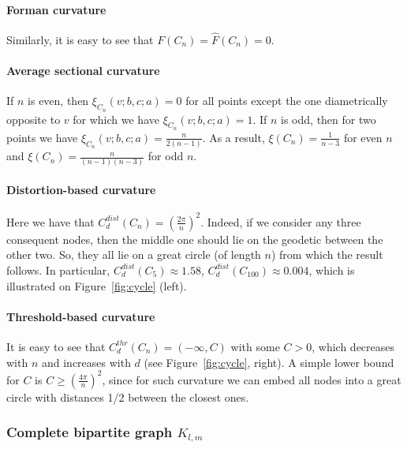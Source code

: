 \documentclass{article} %
\newtheorem{proposition}[theorem]{Proposition}
\begin{document}
\paragraph{Forman curvature} 

Similarly, it is easy to see that $F(C_n) = \hat F(C_n) = 0$.

\paragraph{Average sectional curvature} If $n$ is even, then $\xi_{C_n}(v;b,c;a) = 0$ for all points except the one diametrically opposite to $v$ for which we have $\xi_{C_n}(v;b,c;a) = 1$. If $n$ is odd, then for two points we have $\xi_{C_n}(v;b,c;a) = \frac{n}{2(n-1)}$. As a result, $\xi(C_n) = \frac{1}{n-3}$ for even $n$ and $\xi(C_n) = \frac{n}{(n-1)(n-3)}$ for odd $n$.

\paragraph{Distortion-based curvature} 

Here we have that
$	C_d^{dist}(C_n) = \left(\frac{2\pi}{n}\right)^2.$
Indeed, if we consider any three consequent nodes, then the middle one should lie on the geodetic between the other two. So, they all lie on a great circle (of length $n$) from which the result follows.
In particular, $C_d^{dist}(C_5) \approx 1.58$, $C_d^{dist}(C_{100}) \approx 0.004$, which is illustrated on Figure~\ref{fig:cycle} (left).

\paragraph{Threshold-based curvature} 
It is easy to see that $C_d^{thr}(C_n) = (-\infty, C)$ with some $C>0$, which decreases with $n$ and increases with $d$ (see Figure~\ref{fig:cycle}, right). A simple lower bound for $C$ is $C \ge \left(\frac{4\pi}{n}\right)^2$, since for such curvature we can embed all nodes into a great circle with distances 1/2 between the closest ones. 


\subsubsection{Complete bipartite graph $K_{l,m}$}
\end{document}
